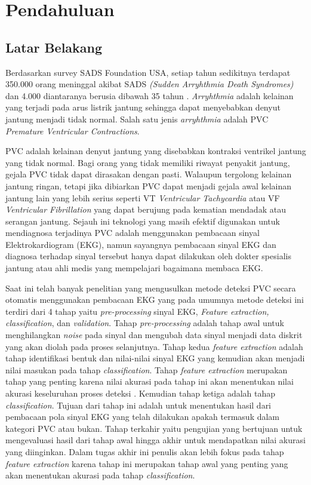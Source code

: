 \chapter{Pendahuluan}
\section{Latar Belakang}
Berdasarkan survey SADS Foundation USA, setiap tahun sedikitnya terdapat 350.000 orang meninggal akibat SADS \textit{(Sudden Arryhthmia Death Syndromes)} dan 4.000 diantaranya berusia dibawah 35 tahun \cite{sads}. \textit{Arryhthmia} adalah kelainan yang terjadi pada arus listrik jantung sehingga dapat menyebabkan denyut jantung menjadi tidak normal. Salah satu jenis \textit{arryhthmia} adalah PVC \textit{Premature Ventricular Contractions}.

PVC adalah kelainan denyut jantung yang disebabkan kontraksi ventrikel jantung yang tidak normal. Bagi orang yang tidak memiliki riwayat penyakit jantung, gejala PVC tidak dapat dirasakan dengan pasti. Walaupun tergolong kelainan jantung ringan, tetapi jika dibiarkan PVC dapat menjadi gejala awal kelainan jantung lain yang lebih serius\cite{RobertChen,Pedro2014} seperti VT \textit{Ventricular Tachycardia} atau VF \textit{Ventricular Fibrillation} yang dapat berujung pada kematian mendadak atau serangan jantung. Sejauh ini teknologi yang masih efektif digunakan untuk mendiagnosa terjadinya PVC adalah menggunakan pembacaan sinyal Elektrokardiogram (EKG)\cite{Karpagachelvi2010,RobertChen,Sreelakshmi}, namun sayangnya pembacaan sinyal EKG dan diagnosa terhadap sinyal tersebut hanya dapat dilakukan oleh dokter spesialis jantung atau ahli medis yang mempelajari bagaimana membaca EKG. 

Saat ini telah banyak penelitian yang mengusulkan metode deteksi PVC secara otomatis menggunakan pembacaan EKG yang pada umumnya metode deteksi ini terdiri dari 4 tahap yaitu \textit{pre-processing} sinyal EKG, \textit{Feature extraction, classification}, dan \textit{validation}. Tahap \textit{pre-processing} adalah tahap awal untuk menghilangkan \textit{noise} pada sinyal dan mengubah data sinyal menjadi data diskrit yang akan diolah pada proses selanjutnya. Tahap kedua \textit{feature extraction} adalah tahap identifikasi bentuk dan nilai-nilai sinyal EKG yang kemudian akan menjadi nilai masukan pada tahap \textit{classification}. Tahap \textit{feature extraction} merupakan tahap yang penting karena nilai akurasi pada tahap ini akan menentukan nilai akurasi keseluruhan proses deteksi \cite{Sreelakshmi,RobertChen}. Kemudian tahap ketiga adalah tahap \textit{classification}. Tujuan dari tahap ini adalah untuk menentukan hasil dari pembacaan pola sinyal EKG yang telah dilakukan apakah termasuk dalam kategori PVC atau bukan. Tahap terkahir yaitu pengujian yang bertujuan untuk mengevaluasi hasil dari tahap awal hingga akhir untuk mendapatkan nilai akurasi yang diinginkan. Dalam tugas akhir ini penulis akan lebih fokus pada tahap \textit{feature extraction} karena tahap ini merupakan tahap awal yang penting yang akan menentukan akurasi pada tahap \textit{classification}.

